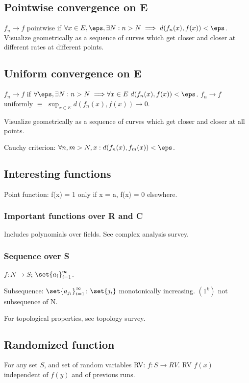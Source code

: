 \documentclass[oneside, article]{memoir}
\begin{document}
\subsection{Pointwise convergence on E}
$f_{n} \to f$ pointwise if $\forall x \in E, \eps, \exists N: n > N \implies d(f_n(x), f(x)) < \eps$. Visualize geometrically as a sequence of curves which get closer and closer at different rates at different points.

\subsection{Uniform convergence on E}
$f_{n} \to f$ if $\forall \eps, \exists N: n > N \implies\\
 \forall x \in E\ d(f_n(x), f(x)) < \eps$. $f_{n} \to f$ uniformly $\equiv$ $\sup_{x \in E} d(f_{n}(x), f(x)) \to 0$.

Visualize geometrically as a sequence of curves which get closer and closer at all points.

Cauchy criterion: $\forall n, m>N, x: d(f_{n}(x), f_{m}(x)) < \eps$.

\subsection{Interesting functions}
Point function: f(x) = 1 only if x = a, f(x) = 0 elsewhere.

\subsubsection{Important functions over R and C}
Includes polynomials over fields. See complex analysis survey.

\subsubsection{Sequence over S}
$f:N\to S$; $\set{a_{i}}_{i=1}^{\infty}$.

Subsequence: $\set{a_{j_{i}}}_{i=1}^{\infty}$: $\set{j_{i}}$ monotonically increasing. $(1^{k})$ not subsequence of N.

For topological properties, see topology survey.

\subsection{Randomized function}
For any set $S$, and set of random variables RV: $f: S \to RV$. RV $f(x)$ independent of $f(y)$ and of previous runs.
\end{document}
